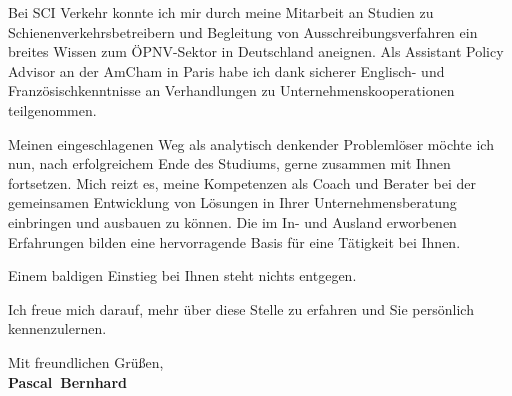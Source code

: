 \documentclass[11pt,a4paper]{article}
\def\firstname{Pascal}
\def\familyname{Bernhard}
\begin{document}
Bei SCI Verkehr konnte ich mir durch meine Mitarbeit an Studien zu Schienenverkehrsbetreibern und Begleitung von Ausschreibungsverfahren ein breites Wissen zum ÖPNV-Sektor in Deutschland aneignen. Als Assistant Policy Advisor an der AmCham in Paris habe ich dank sicherer Englisch- und Französischkenntnisse an Verhandlungen zu Unternehmenskooperationen teilgenommen.

Meinen eingeschlagenen Weg als analytisch denkender Problemlöser möchte ich nun, nach erfolgreichem Ende des Studiums, gerne zusammen mit Ihnen fortsetzen. Mich reizt es, meine Kompetenzen als Coach und Berater bei der gemeinsamen Entwicklung von Lösungen in Ihrer Unternehmensberatung einbringen und ausbauen zu können. Die im In- und Ausland erworbenen Erfahrungen bilden eine hervorragende Basis für eine Tätigkeit bei Ihnen.


Einem baldigen Einstieg bei Ihnen steht nichts entgegen.

Ich freue mich darauf, mehr über diese Stelle zu erfahren und Sie persönlich kennenzulernen.

  
Mit freundlichen Grüßen,\\[3em] %
%
{\bfseries \firstname~\familyname}\\
%
\end{document}
